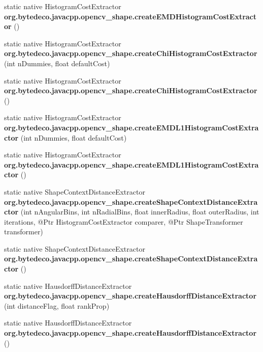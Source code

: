 \begin{DoxyCompactItemize}
\item 
\mbox{\label{group__shape_gad66f3042ff3e80ed3d3a98fccfba611f}} 
static native Histogram\+Cost\+Extractor {\bfseries org.\+bytedeco.\+javacpp.\+opencv\+\_\+shape.\+create\+E\+M\+D\+Histogram\+Cost\+Extractor} ()
\item 
\mbox{\label{group__shape_gac7f253325365590ab0014a96003a81b9}} 
static native Histogram\+Cost\+Extractor {\bfseries org.\+bytedeco.\+javacpp.\+opencv\+\_\+shape.\+create\+Chi\+Histogram\+Cost\+Extractor} (int n\+Dummies, float default\+Cost)
\item 
\mbox{\label{group__shape_ga015bf3d4bc5b1fb515f3a3d1d036f4c6}} 
static native Histogram\+Cost\+Extractor {\bfseries org.\+bytedeco.\+javacpp.\+opencv\+\_\+shape.\+create\+Chi\+Histogram\+Cost\+Extractor} ()
\item 
\mbox{\label{group__shape_ga01b32427cada320b1c99bb1dfaa20f8d}} 
static native Histogram\+Cost\+Extractor {\bfseries org.\+bytedeco.\+javacpp.\+opencv\+\_\+shape.\+create\+E\+M\+D\+L1\+Histogram\+Cost\+Extractor} (int n\+Dummies, float default\+Cost)
\item 
\mbox{\label{group__shape_ga41c4a387619bfa3aed91ab940f91f8dd}} 
static native Histogram\+Cost\+Extractor {\bfseries org.\+bytedeco.\+javacpp.\+opencv\+\_\+shape.\+create\+E\+M\+D\+L1\+Histogram\+Cost\+Extractor} ()
\item 
\mbox{\label{group__shape_ga6057d400ec1dd9475b9fef637018e97c}} 
static native Shape\+Context\+Distance\+Extractor {\bfseries org.\+bytedeco.\+javacpp.\+opencv\+\_\+shape.\+create\+Shape\+Context\+Distance\+Extractor} (int n\+Angular\+Bins, int n\+Radial\+Bins, float inner\+Radius, float outer\+Radius, int iterations, @Ptr Histogram\+Cost\+Extractor comparer, @Ptr Shape\+Transformer transformer)
\item 
\mbox{\label{group__shape_ga459cb340a130806d0db0f13094055cf3}} 
static native Shape\+Context\+Distance\+Extractor {\bfseries org.\+bytedeco.\+javacpp.\+opencv\+\_\+shape.\+create\+Shape\+Context\+Distance\+Extractor} ()
\item 
\mbox{\label{group__shape_gaef3f481ee41d6d7e46b2c82d55194db9}} 
static native Hausdorff\+Distance\+Extractor {\bfseries org.\+bytedeco.\+javacpp.\+opencv\+\_\+shape.\+create\+Hausdorff\+Distance\+Extractor} (int distance\+Flag, float rank\+Prop)
\item 
\mbox{\label{group__shape_gaf680073bab30d3e0d72516c2d4614f70}} 
static native Hausdorff\+Distance\+Extractor {\bfseries org.\+bytedeco.\+javacpp.\+opencv\+\_\+shape.\+create\+Hausdorff\+Distance\+Extractor} ()
\end{DoxyCompactItemize}


